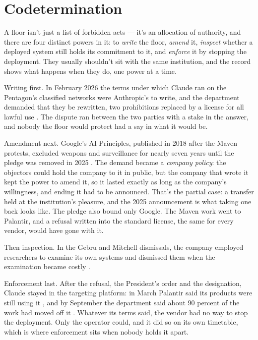 \chapter{Codetermination}
\label{sec:10}
A floor isn't just a list of forbidden acts — it's an allocation of authority, and there are four distinct powers in it: to \emph{write} the floor, \emph{amend} it, \emph{inspect} whether a deployed system still holds its commitment to it, and \emph{enforce} it by stopping the deployment. They usually shouldn't sit with the same institution, and the record shows what happens when they do, one power at a time.

Writing first. In February 2026 the terms under which Claude ran on the Pentagon's classified networks were Anthropic's to write, and the department demanded that they be rewritten, two prohibitions replaced by a license for all lawful use \autocite{defenseone2026ultimatum,volokh2026anthropiccontract}. The dispute ran between the two parties with a stake in the answer, and nobody the floor would protect had a say in what it would be.

Amendment next. Google's AI Principles, published in 2018 after the Maven protests, excluded weapons and surveillance \autocite{castelino2018google,conger2018maven,pichai2018principles} for nearly seven years until the pledge was removed in 2025 \autocite{google2025principles}. The demand became a \emph{company policy}: the objectors could hold the company to it in public, but the company that wrote it kept the power to amend it, so it lasted exactly as long as the company's willingness, and ending it had to be announced. That's the partial case: a transfer held at the institution's pleasure, and the 2025 announcement is what taking one back looks like. The pledge also bound only Google. The Maven work went to Palantir, and a refusal written into the standard license, the same for every vendor, would have gone with it.

Then inspection. In the Gebru and Mitchell dismissals, the company employed researchers to examine its own systems and dismissed them when the examination became costly \autocite{dickey2020gebru,dickey2021mitchell}.

Enforcement last. After the refusal, the President's order and the designation, Claude stayed in the targeting platform: in March Palantir said its products were still using it \autocite{cnbc2026karp}, and by September the department said about 90 percent of the work had moved off it \autocite{defensescoop2026michael}. Whatever its terms said, the vendor had no way to stop the deployment. Only the operator could, and it did so on its own timetable, which is where enforcement sits when nobody holds it apart.
